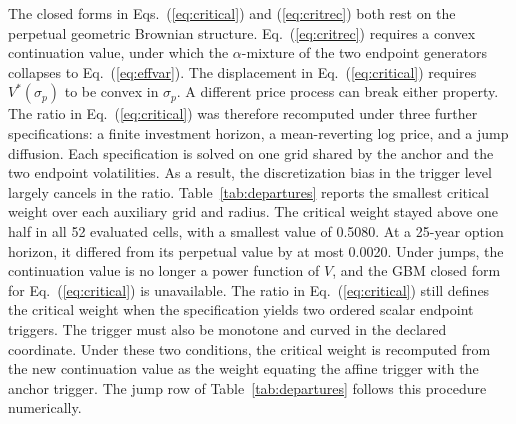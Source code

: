 The closed forms in Eqs.~(\ref{eq:critical}) and (\ref{eq:critrec}) both rest on the perpetual geometric Brownian structure. Eq.~(\ref{eq:critrec}) requires a convex continuation value, under which the $\alpha$-mixture of the two endpoint generators collapses to Eq.~(\ref{eq:effvar}). The displacement in Eq.~(\ref{eq:critical}) requires $V^{*}(\sigma_p)$ to be convex in $\sigma_p$. A different price process can break either property. The ratio in Eq.~(\ref{eq:critical}) was therefore recomputed under three further specifications: a finite investment horizon, a mean-reverting log price, and a jump diffusion. Each specification is solved on one grid shared by the anchor and the two endpoint volatilities. As a result, the discretization bias in the trigger level largely cancels in the ratio. Table~\ref{tab:departures} reports the smallest critical weight over each auxiliary grid and radius. The critical weight stayed above one half in all 52 evaluated cells, with a smallest value of 0.5080. At a 25-year option horizon, it differed from its perpetual value by at most 0.0020. Under jumps, the continuation value is no longer a power function of $V$, and the GBM closed form for Eq.~(\ref{eq:critical}) is unavailable. The ratio in Eq.~(\ref{eq:critical}) still defines the critical weight when the specification yields two ordered scalar endpoint triggers. The trigger must also be monotone and curved in the declared coordinate. Under these two conditions, the critical weight is recomputed from the new continuation value as the weight equating the affine trigger with the anchor trigger. The jump row of Table~\ref{tab:departures} follows this procedure numerically.

